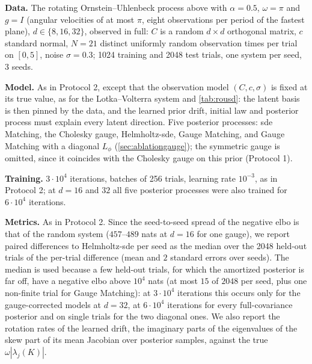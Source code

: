\documentclass{article} %
\newcommand{\vol}{g}
\begin{document}
\textbf{Data.} The rotating Ornstein--Uhlenbeck process above with $\alpha = 0.5$, $\omega = \pi$ and $\vol = I$ (angular velocities of at most $\pi$, eight observations per period of the fastest plane), $d \in \{8, 16, 32\}$, observed in full: $C$ is a random $d \times d$ orthogonal matrix, $c$ standard normal, $N = 21$ distinct uniformly random observation times per trial on $[0, 5]$, noise $\sigma = 0.3$; 1024 training and 2048 test trials, one system per seed, 3 seeds.

\textbf{Model.} As in Protocol 2, except that the observation model $(C, c, \sigma)$ is fixed at its true value, as for the Lotka--Volterra system and \cref{tab:rousd}: the latent basis is then pinned by the data, and the learned prior drift, initial law and posterior process must explain every latent direction. Five posterior processes: \gls{sde} Matching, the Cholesky gauge, Helmholtz-\gls{sde}, Gauge Matching, and Gauge Matching with a diagonal $L_\phi$ (\cref{sec:ablationgauge}); the symmetric gauge is omitted, since it coincides with the Cholesky gauge on this prior (Protocol 1).

\textbf{Training.} $3 \cdot 10^4$ iterations, batches of 256 trials, learning rate $10^{-3}$, as in Protocol 2; at $d = 16$ and $32$ all five posterior processes were also trained for $6 \cdot 10^4$ iterations.

\textbf{Metrics.} As in Protocol 2. Since the seed-to-seed spread of the negative \gls{elbo} is that of the random system ($457$--$489$ nats at $d = 16$ for one gauge), we report paired differences to Helmholtz-\gls{sde} per seed as the median over the 2048 held-out trials of the per-trial difference (mean and $2$ standard errors over seeds). The median is used because a few held-out trials, for which the amortized posterior is far off, have a negative \gls{elbo} above $10^4$ nats (at most $15$ of $2048$ per seed, plus one non-finite trial for Gauge Matching): at $3 \cdot 10^4$ iterations this occurs only for the gauge-corrected models at $d = 32$, at $6 \cdot 10^4$ iterations for every full-covariance posterior and on single trials for the two diagonal ones. We also report the rotation rates of the learned drift, the imaginary parts of the eigenvalues of the skew part of its mean Jacobian over posterior samples, against the true $\omega |\lambda_j(K)|$.
\end{document}
